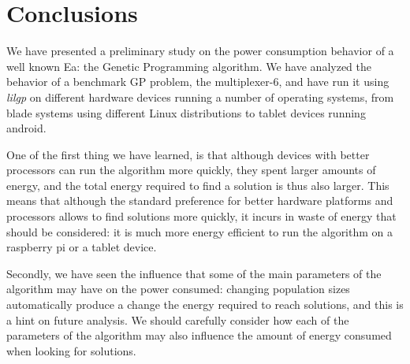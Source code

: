 \section{Conclusions}
\label{conclusions}

We have presented a preliminary study on the power consumption behavior of a well known Ea: the Genetic Programming algorithm.  We have analyzed the behavior of a benchmark GP problem, the multiplexer-6, and have run it using \textit{lilgp} on different hardware devices running a number of operating systems, from blade systems using different Linux distributions to tablet devices running android.

One of the first thing we have learned, is that although devices with better processors can run the algorithm more quickly, they spent larger amounts of energy, and the total energy required to find a solution is thus also larger.  This means that although the standard preference for better hardware platforms and processors allows to find solutions more quickly, it incurs in waste of energy that should be considered:  it is much more energy efficient to run the algorithm on a raspberry pi or a tablet device.

Secondly, we have seen the influence that some of the main parameters of the algorithm may have on the power consumed:  changing population sizes automatically produce a change the energy required to reach solutions, and this is a hint on future analysis.  We should carefully consider how each of the parameters of the algorithm may also influence the amount of energy consumed when looking for solutions.